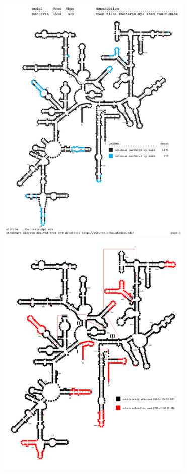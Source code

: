 \begin{figure}
  \begin{center}
    \includegraphics[width=3.7in]{Figures/bacteria-0p1-maskcol}
    \includegraphics[width=3.7in]{Figures/lane-ecoli}
  \end{center}
  \caption[Similarity of an SSU-ALIGN automatically
    constructed mask with David Lane's SSU alignment mask.]{
}
\end{figure}
